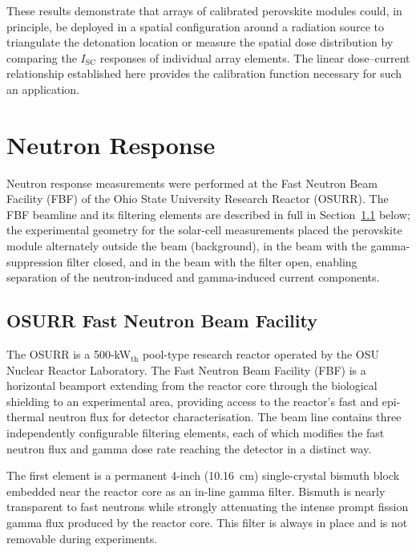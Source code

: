These results demonstrate that arrays of calibrated perovskite modules
could, in principle, be deployed in a spatial configuration around a
radiation source to triangulate the detonation location or measure
the spatial dose distribution by comparing the $I_{\mathrm{SC}}$ responses
of individual array elements.  The linear dose--current relationship
established here provides the calibration function necessary for
such an application.

\section{Neutron Response}
\label{sec:neutron_response}

Neutron response measurements were performed at the Fast Neutron
Beam Facility (FBF) of the Ohio State University Research Reactor
(OSURR).  The FBF beamline and its filtering elements are
described in full in Section~\ref{sec:osurr_fbf} below; the
experimental geometry for the solar-cell measurements placed the
perovskite module alternately outside the beam (background), in
the beam with the gamma-suppression filter closed, and in the beam
with the filter open, enabling separation of the neutron-induced
and gamma-induced current components.

\subsection{OSURR Fast Neutron Beam Facility}
\label{sec:osurr_fbf}

The OSURR is a 500-kW$_{\mathrm{th}}$ pool-type research reactor
operated by the OSU Nuclear Reactor Laboratory.  The Fast Neutron
Beam Facility (FBF) is a horizontal beamport extending from the
reactor core through the biological shielding to an experimental
area, providing access to the reactor's fast and epi-thermal
neutron flux for detector characterisation.  The beam line
contains three independently configurable filtering elements,
each of which modifies the fast neutron flux and gamma dose rate
reaching the detector in a distinct way.

The first element is a permanent 4-inch (10.16~cm) single-crystal
bismuth block embedded near the reactor core as an in-line gamma
filter.  Bismuth is nearly transparent to fast neutrons while
strongly attenuating the intense prompt fission gamma flux
produced by the reactor core.  This filter is always in place
and is not removable during experiments.

